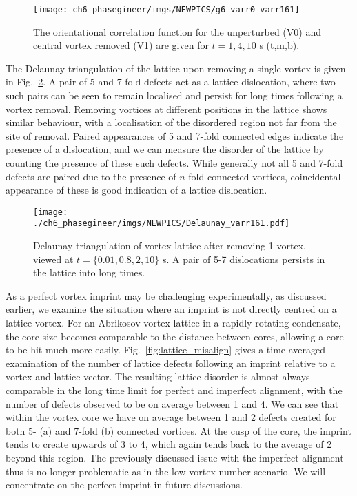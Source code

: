 \begin{figure}[H] \centering
    \texttt{[image: ch6\_phasegineer/imgs/NEWPICS/g6\_varr0\_varr161]}
    \caption{The orientational correlation function for the unperturbed (V0) and central vortex removed (V1) are given for $t={1,4,10}$ s (t,m,b).}\label{fig:g6}
\end{figure}

The Delaunay triangulation of the lattice upon removing a single vortex is given in Fig.~\ref{fig:deltri_1vtx}. A pair of 5 and 7-fold defects act as a lattice dislocation, where two such pairs can be seen to remain localised and persist for long times following a vortex removal. Removing vortices at different positions in the lattice shows similar behaviour, with a localisation of the disordered region not far from the site of removal. Paired appearances of 5 and 7-fold connected edges indicate the presence of a dislocation, and we can measure the disorder of the lattice by counting the presence of these such defects. While generally not all 5 and 7-fold defects are paired due to the presence of $n$-fold connected vortices, coincidental appearance of these is good indication of a lattice dislocation.

\begin{figure}[H] \centering
    \texttt{[image: ./ch6\_phasegineer/imgs/NEWPICS/Delaunay\_varr161.pdf]}
    \caption{Delaunay triangulation of vortex lattice after removing 1 vortex, viewed at $t=\{0.01,0.8,2,10\}$ s. A pair of 5-7 dislocations persists in the lattice into long times.}\label{fig:deltri_1vtx}
\end{figure}

As a perfect vortex imprint may be challenging experimentally, as discussed earlier, we examine the situation where an imprint is not directly centred on a lattice vortex. For an Abrikosov vortex lattice in a rapidly rotating condensate, the core size becomes comparable to the distance between cores, allowing a core to be hit much more easily. Fig.~\ref{fig:lattice_misalign} gives a time-averaged examination of the number of lattice defects following an imprint relative to a vortex and lattice vector. The resulting lattice disorder is almost always comparable in the long time limit for perfect and imperfect alignment, with the number of defects observed to be on average between 1 and 4.  We can see that within the vortex core we have on average between 1 and 2 defects created for both 5- (a) and 7-fold (b) connected vortices. At the cusp of the core, the imprint tends to create upwards of 3 to 4, which again tends back to the average of 2 beyond this region. The previously discussed issue with the imperfect alignment thus is no longer problematic as in the low vortex number scenario. We will concentrate on the perfect imprint in future discussions.


